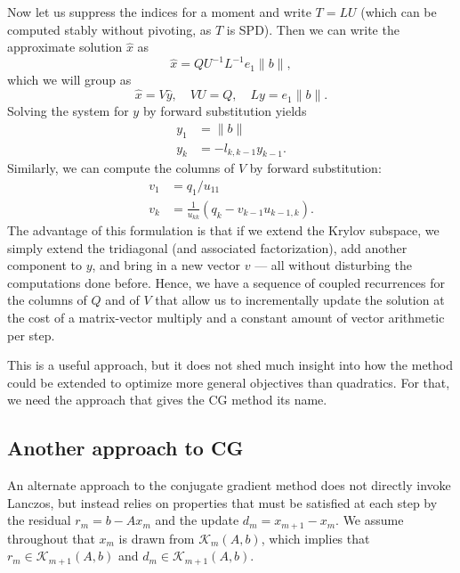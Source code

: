 \documentclass[12pt, leqno]{article} %
\newcommand{\calK}{\mathcal{K}}
\begin{document}
Now let us suppress the indices for a moment and
write $T = LU$ (which can be computed stably without pivoting,
as $T$ is SPD).  Then we can write the approximate solution
$\hat{x}$ as
\[
  \hat{x} = Q U^{-1} L^{-1} e_1 \|b\|,
\]
which we will group as
\[
  \hat{x} = V \hat{y}, \quad VU = Q, \quad Ly = e_1 \|b\|.
\]
Solving the system for $y$ by forward substitution yields
\begin{align*}
  y_1 &= \|b\| \\
  y_k &= -l_{k,k-1} y_{k-1}.
\end{align*}
Similarly, we can compute the columns of $V$ by forward
substitution:
\begin{align*}
  v_1 &= q_1 / u_{11} \\
  v_k &= \frac{1}{u_{kk}} \left( q_k - v_{k-1} u_{k-1,k} \right).
\end{align*}
The advantage of this formulation is that if we extend the Krylov
subspace, we simply extend the tridiagonal (and associated
factorization), add another component to $y$, and bring in a new
vector $v$ --- all without disturbing the computations done before.
Hence, we have a sequence of coupled recurrences for the columns
of $Q$ and of $V$ that allow us to incrementally update the solution
at the cost of a matrix-vector multiply and a constant amount
of vector arithmetic per step.

This is a useful approach, but it does not shed much insight into how the
method could be extended to optimize more general objectives than
quadratics.  For that, we need the approach that gives the CG method its
name.

\subsection{Another approach to CG}

An alternate approach to the conjugate gradient method does not directly
invoke Lanczos, but instead relies on properties that must be satisfied
at each step by the residual $r_m = b-Ax_m$ and the update
$d_m = x_{m+1}-x_m$.  We assume throughout that $x_m$ is drawn from
$\calK_m(A,b)$, which implies that $r_m \in \calK_{m+1}(A,b)$ and
$d_m \in \calK_{m+1}(A,b)$.
\end{document}
